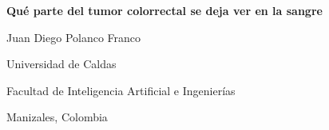 \thispagestyle{empty}
\begin{center}
\vspace*{2.2cm}
{\fontsize{16}{20}\selectfont\bfseries Qué parte del tumor colorrectal se deja ver en la sangre\par}
\vspace{1.8cm}
{\fontsize{14}{18}\selectfont Juan Diego Polanco Franco\par}
\vspace{1.8cm}
{\fontsize{14}{18}\selectfont Universidad de Caldas\par}
\vspace{0.8cm}
{\fontsize{12}{16}\selectfont Facultad de Inteligencia Artificial e Ingenierías\par}
\vspace{1.6cm}
{\fontsize{12}{16}\selectfont Manizales, Colombia\par}
\vspace{0.4cm}
{\fontsize{12}{16}\par}
\end{center}
\clearpage
